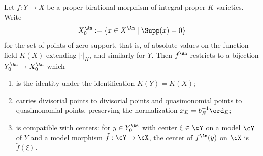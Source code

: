 \begin{lemma}
\label{lem:ch30-birational-bijection}
Let \(f:Y\to X\) be a proper birational morphism of integral proper
\(K\)-varieties.  Write
\[
 X^{\An}_0:=\{x\in X^{\An}\mid \Supp(x)=0\}
\]
for the set of points of zero support, that is, of absolute values on the
function field \(K(X)\) extending \(|\cdot|_K\), and similarly for \(Y\).
Then \(f^{\An}\) restricts to a bijection
\(Y^{\An}_0\to X^{\An}_0\) which
\begin{enumerate}
\item\label{itm:ch30-bb:val}
is the identity under the identification \(K(Y)=K(X)\);
\item\label{itm:ch30-bb:divisorial}
carries divisorial points to divisorial points and quasimonomial points to
quasimonomial points, preserving the normalization \(x_E=b_E^{-1}\ord_E\);
\item\label{itm:ch30-bb:centers}
is compatible with centers: for \(y\in Y^{\An}_0\) with center
\(\xi\in\cY\) on a model \(\cY\) of \(Y\) and a model morphism
\(\tilde f:\cY\to\cX\), the center of \(f^{\An}(y)\) on \(\cX\) is
\(\tilde f(\xi)\).
\end{enumerate}
\end{lemma}

